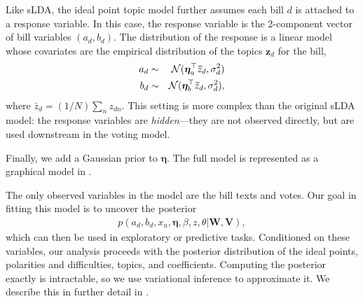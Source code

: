 


Like sLDA, the ideal point topic model further assumes each bill
$d$ is attached to a response variable.  In this case, the
response variable is the 2-component vector of bill variables $(a_d,
b_d)$.  The distribution of the response is a linear model whose
covariates are the empirical distribution of the topics $\bm z_d$ for the
bill,
\begin{align*}
  a_d &\sim& {\cal N}(\bm \eta_a^\top \bm \bar{z}_d, \sigma_d^2) \nonumber \\
  b_d &\sim& {\cal N}(\bm \eta_b^\top \bm \bar{z}_d, \sigma_d^2), \nonumber
\end{align*}
where $\bar{z}_d = (1/N) \sum_n z_{dn}$.  This setting is more complex
than the original sLDA model: the response variables are
\textit{hidden}---they are not observed directly, but are used
downstream in the voting model.

Finally, we add a Gaussian prior to $\bm \eta$.  The full model is
represented as a graphical model in .

The only observed variables in the model are the bill texts and votes.
Our goal in fitting this model is to uncover the posterior
\begin{align}
  p(a_d, b_d, x_u, \bm \eta, \beta, z, \theta | \bm W, \bm V), \label{eq:posterior}
\end{align}
which can then be used in exploratory or predictive tasks.
Conditioned on these variables, our analysis proceeds with the
posterior distribution of the ideal points, polarities and
difficulties, topics, and coefficients. Computing the posterior exactly
is intractable, so we use variational inference to approximate it.  We
describe this in further detail in .


